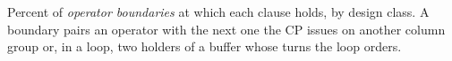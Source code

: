 \begin{table}[t]
    \centering
    \caption{Percent of \emph{operator boundaries} at which each clause holds, by design class. A boundary pairs an operator with the next one the CP issues on another column group or, in a loop, two holders of a buffer whose turns the loop orders.}
    \label{tab:census}

\end{table}
